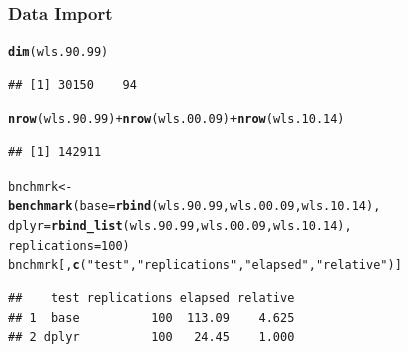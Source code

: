 \documentclass{beamer}\usepackage[]{graphicx}\usepackage[]{color}
\makeatletter
\newcommand{\hlnum}[1]{\textcolor[rgb]{0.686,0.059,0.569}{#1}}%
\newcommand{\hlstr}[1]{\textcolor[rgb]{0.192,0.494,0.8}{#1}}%
\newcommand{\hlopt}[1]{\textcolor[rgb]{0,0,0}{#1}}%
\newcommand{\hlstd}[1]{\textcolor[rgb]{0.345,0.345,0.345}{#1}}%
\newcommand{\hlkwb}[1]{\textcolor[rgb]{0.69,0.353,0.396}{#1}}%
\newcommand{\hlkwc}[1]{\textcolor[rgb]{0.333,0.667,0.333}{#1}}%
\newcommand{\hlkwd}[1]{\textcolor[rgb]{0.737,0.353,0.396}{\textbf{#1}}}%
\newenvironment{kframe}{%
 \def\at@end@of@kframe{}%
 \ifinner\ifhmode%
  \def\at@end@of@kframe{\end{minipage}}%
  \begin{minipage}{\columnwidth}%
 \fi\fi%
 \def\FrameCommand##1{\hskip\@totalleftmargin \hskip-\fboxsep
 \colorbox{shadecolor}{##1}\hskip-\fboxsep
     \hskip-\linewidth \hskip-\@totalleftmargin \hskip\columnwidth}%
 \MakeFramed {\advance\hsize-\width
   \@totalleftmargin\z@ \linewidth\hsize
   \@setminipage}}%
 {\par\unskip\endMakeFramed%
 \at@end@of@kframe}
\newenvironment{knitrout}{}{} %
\makeatother
\begin{document}
\begin{frame}[fragile]
  \frametitle{Data Import}
\begin{knitrout}\footnotesize
{}\color{fgcolor}\begin{kframe}
\begin{alltt}
\hlkwd{dim}\hlstd{(wls.90.99)}
\end{alltt}
\begin{verbatim}
## [1] 30150    94
\end{verbatim}
\begin{alltt}
\hlkwd{nrow}\hlstd{(wls.90.99)} \hlopt{+} \hlkwd{nrow}\hlstd{(wls.00.09)} \hlopt{+} \hlkwd{nrow}\hlstd{(wls.10.14)}
\end{alltt}
\begin{verbatim}
## [1] 142911
\end{verbatim}
\begin{alltt}
\hlstd{bnchmrk} \hlkwb{<-}
  \hlkwd{benchmark}\hlstd{(}\hlkwc{base}  \hlstd{=} \hlkwd{rbind}\hlstd{(wls.90.99, wls.00.09, wls.10.14),}
            \hlkwc{dplyr} \hlstd{=} \hlkwd{rbind_list}\hlstd{(wls.90.99, wls.00.09, wls.10.14),}
            \hlkwc{replications} \hlstd{=} \hlnum{100}\hlstd{)}
\hlstd{bnchmrk[,} \hlkwd{c}\hlstd{(}\hlstr{"test"}\hlstd{,} \hlstr{"replications"}\hlstd{,} \hlstr{"elapsed"}\hlstd{,} \hlstr{"relative"}\hlstd{)]}
\end{alltt}
\begin{verbatim}
##    test replications elapsed relative
## 1  base          100  113.09    4.625
## 2 dplyr          100   24.45    1.000
\end{verbatim}
\end{kframe}
\end{knitrout}
\end{frame} 
\end{document}
